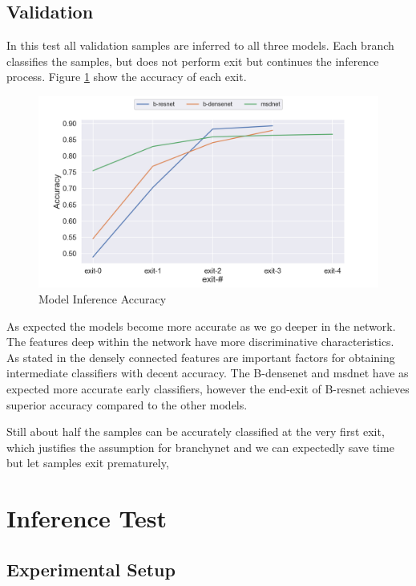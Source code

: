 \subsection{Validation}

In this test all validation samples are inferred to all three models. Each branch classifies the samples, but does not perform exit but continues the inference process. Figure \ref{fig:exit-accuracy} show the accuracy of each exit.  

\begin{figure}
	\includegraphics[width=\linewidth]{figures/inference_plots/exit_acc}
	\caption[Model Inference Accuracy]{Model Inference Accuracy}
	\label{fig:exit-accuracy}
\end{figure}

As expected the models become more accurate as we go deeper in the network. The features deep within the network have more discriminative characteristics. As stated in \cite{huang_multi-scale_2017} the densely connected features are important factors for obtaining intermediate classifiers with decent accuracy. The B-\gls{densenet} and \gls{msdnet} have as expected more accurate early classifiers, however the end-exit of B-\gls{resnet} achieves superior accuracy compared to the other models.

Still about half the samples can be accurately classified at the very first exit, which justifies the assumption for \gls{branchynet} and we can expectedly save time but let samples exit prematurely,


\section{Inference Test}

\subsection{Experimental Setup}




